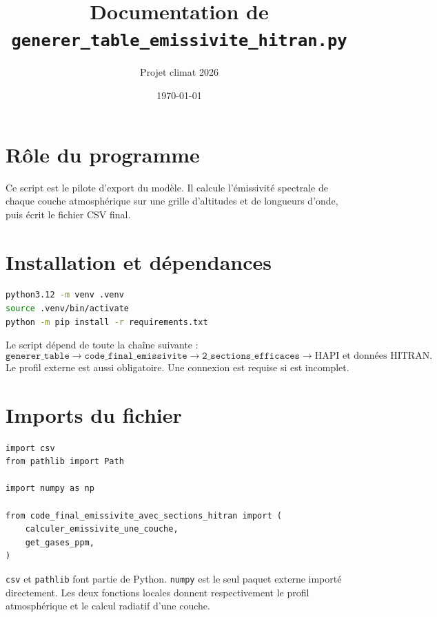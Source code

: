 \documentclass[11pt,a4paper]{article}
\title{Documentation de \texttt{generer\_table\_emissivite\_hitran.py}}
\author{Projet climat 2026}
\date{\today}
\begin{document}
\maketitle
\tableofcontents

\section{Rôle du programme}

Ce script est le pilote d'export du modèle. Il calcule l'émissivité spectrale
de chaque couche atmosphérique sur une grille d'altitudes et de longueurs
d'onde, puis écrit le fichier CSV final.

\section{Installation et dépendances}

\begin{lstlisting}[language=bash]
python3.12 -m venv .venv
source .venv/bin/activate
python -m pip install -r requirements.txt
\end{lstlisting}

Le script dépend de toute la chaîne suivante :
\begin{equation*}
\texttt{generer\_table}
\longrightarrow \texttt{code\_final\_emissivite}
\longrightarrow \texttt{2\_sections\_efficaces}
\longrightarrow \text{HAPI et données HITRAN}.
\end{equation*}
Le profil externe
 est aussi
obligatoire. Une connexion est requise si  est incomplet.

\section{Imports du fichier}

\begin{lstlisting}
import csv
from pathlib import Path

import numpy as np

from code_final_emissivite_avec_sections_hitran import (
    calculer_emissivite_une_couche,
    get_gases_ppm,
)
\end{lstlisting}

\texttt{csv} et \texttt{pathlib} font partie de Python. \texttt{numpy} est le
seul paquet externe importé directement. Les deux fonctions locales donnent
respectivement le profil atmosphérique et le calcul radiatif d'une couche.
\end{document}
